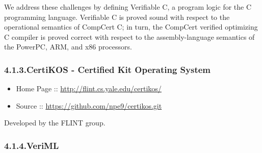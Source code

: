 \documentclass[12pt,twoside]{article}
\begin{document}
\noindent{}We address these challenges by defining Verifiable C, a program logic
for the C programming language. Verifiable C is proved sound with
respect to the operational semantics of CompCert C; in turn, the
CompCert verified optimizing C compiler is proved correct with respect
to the assembly-language semantics of the PowerPC, ARM, and x86
processors.%

\subsubsection{4.1.3.\hspace*{0.5em}CertiKOS - Certified Kit Operating System}\label{sec-certikos---certified-kit-operating-system}%

\begin{itemize}[noitemsep,topsep=\mdcompacttopsep]%

\item{}Home Page :: \href{http://flint.cs.yale.edu/certikos/}{{\ttfamily http://\hspace{0pt}flint.\hspace{0pt}cs.\hspace{0pt}yale.\hspace{0pt}edu/\hspace{0pt}certikos/\hspace{0pt}}}%

\item{}Source :: \href{https://github.com/npe9/certikos.git}{{\ttfamily https://\hspace{0pt}github.\hspace{0pt}com/\hspace{0pt}npe9/\hspace{0pt}certikos.\hspace{0pt}git}}%
\end{itemize}%

\noindent{}Developed by the FLINT group.%

\subsubsection{4.1.4.\hspace*{0.5em}VeriML}\label{sec-veriml}%
\end{document}
